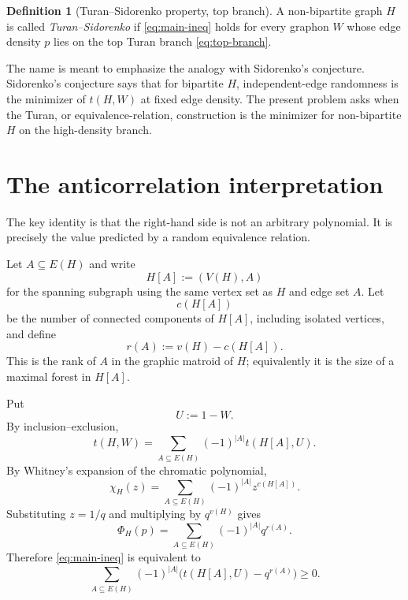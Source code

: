 \documentclass[11pt]{article}
\theoremstyle{definition}
\newtheorem{definition}[theorem]{Definition}
\begin{document}
\begin{definition}[Turan--Sidorenko property, top branch]
A non-bipartite graph $H$ is called \emph{Turan--Sidorenko} if \eqref{eq:main-ineq} holds for every graphon $W$ whose edge density $p$ lies on the top Turan branch \eqref{eq:top-branch}.
\end{definition}

The name is meant to emphasize the analogy with Sidorenko's conjecture.  Sidorenko's conjecture says that for bipartite $H$, independent-edge randomness is the minimizer of $t(H,W)$ at fixed edge density.  The present problem asks when the Turan, or equivalence-relation, construction is the minimizer for non-bipartite $H$ on the high-density branch.

\section{The anticorrelation interpretation}

The key identity is that the right-hand side is not an arbitrary polynomial.  It is precisely the value predicted by a random equivalence relation.

Let $A\subseteq E(H)$ and write
\[
  H[A]:=(V(H),A)
\]
for the spanning subgraph using the same vertex set as $H$ and edge set $A$.  Let
\[
  c(H[A])
\]
be the number of connected components of $H[A]$, including isolated vertices, and define
\[
  r(A):=v(H)-c(H[A]).
\]
This is the rank of $A$ in the graphic matroid of $H$; equivalently it is the size of a maximal forest in $H[A]$.

Put
\[
  U:=1-W.
\]
By inclusion--exclusion,
\begin{equation}\label{eq:IE-density}
  t(H,W)=\sum_{A\subseteq E(H)}(-1)^{|A|}t(H[A],U).
\end{equation}
By Whitney's expansion of the chromatic polynomial,
\begin{equation}\label{eq:Whitney}
  \chi_H(z)=\sum_{A\subseteq E(H)}(-1)^{|A|}z^{c(H[A])}.
\end{equation}
Substituting $z=1/q$ and multiplying by $q^{v(H)}$ gives
\begin{equation}\label{eq:Phi-expansion}
  \Phi_H(p)=\sum_{A\subseteq E(H)}(-1)^{|A|}q^{r(A)}.
\end{equation}
Therefore \eqref{eq:main-ineq} is equivalent to
\begin{equation}\label{eq:signed-deviation}
  \sum_{A\subseteq E(H)}(-1)^{|A|}\bigl(t(H[A],U)-q^{r(A)}\bigr)\ge0.
\end{equation}
\end{document}
